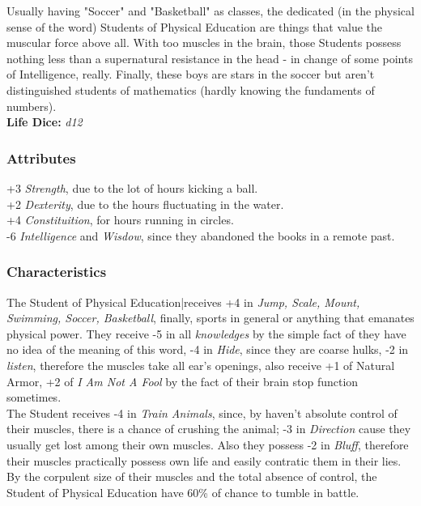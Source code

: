 \documentclass[ letterpaper,12pt]{article}
\begin{document}
Usually having "Soccer" and "Basketball" as classes, the dedicated (in the physical sense of the word) Students of Physical Education are things that value the muscular force above all.  With too muscles in the brain, those Students possess nothing less than a supernatural resistance in the head - in change of some points of Intelligence, really.  Finally, these boys are stars in the soccer but aren't distinguished students of mathematics (hardly knowing the fundaments of numbers).\\

{\bf Life Dice:} {\it d12}

\subsubsection{Attributes}
+3 {\it Strength}, due to the lot of hours kicking a ball.\\
+2 {\it Dexterity}, due to the hours fluctuating in the water.\\
+4 {\it Constituition}, for hours running in circles.\\
-6 {\it Intelligence} and {\it Wisdow}, since they abandoned the books in a remote past.\\

\subsubsection{Characteristics}
The   Student   of   Physical   Education|receives  +4  in  {\it Jump,   Scale,   Mount, Swimming,  Soccer,  Basketball},  finally, sports  in  general  or   anything that emanates physical power. They receive -5 in all {\it knowledges} by the simple fact of they have no idea of the meaning of this word, -4 in {\it Hide}, since they are coarse hulks, -2 in {\it listen}, therefore  the muscles take all ear's openings, also receive +1 of Natural Armor, +2 of {\it I Am Not A Fool} by the fact of their brain stop function sometimes.\\

The  Student  receives  -4 in {\it Train Animals}, since, by haven't absolute control of their muscles,  there  is  a chance of crushing the animal; -3 in {\it Direction} cause they usually get lost among their own muscles. Also  they possess -2 in {\it Bluff}, therefore their muscles practically possess own life and easily contratic them in their lies. \\

By  the  corpulent size of their muscles and the total absence of control, the Student of Physical Education have 60\% of chance to tumble in battle.\\
\end{document}

